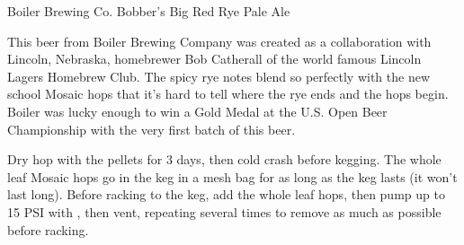 \stylesection{\styleamericanale}

\begin{recipie}{Boiler Brewing Co. Bobber's Big Red Rye Pale Ale}

\begin{aboutblock}
This beer from Boiler Brewing Company was created as a collaboration with Lincoln, Nebraska,
homebrewer Bob Catherall of the world famous Lincoln Lagers Homebrew Club. The spicy rye notes
blend so perfectly with the new school Mosaic hops that it's hard to tell where the rye ends
and the hops begin. Boiler was lucky enough to win a Gold Medal at the U.S. Open Beer Championship
with the very first batch of this beer.
\end{aboutblock}


\begin{methodandtiming}
 
\begin{mashsteps}
\end{mashsteps}

\begin{fermentationsteps}
\end{fermentationsteps}

\begin{directions}
Dry hop with the pellets for 3 days, then cold crash before kegging. The whole leaf Mosaic
hops go in the keg in a mesh bag for as long as the keg lasts (it won't last long). Before
racking to the keg, add the whole leaf hops, then pump up to 15 PSI with , then vent,
repeating several times to remove as much  as possible before racking.
\end{directions}

\end{methodandtiming}

\pagebreak

\begin{ingredientsblock}

\begin{malts}
\end{malts}

\begin{hops}
\end{hops}

\begin{yeasts}
\end{yeasts}

\end{ingredientsblock}

\end{recipie}

